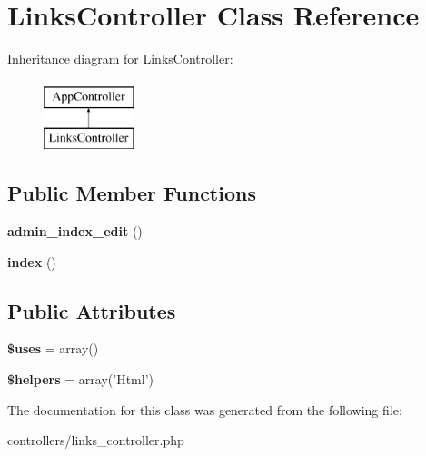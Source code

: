 \hypertarget{class_links_controller}{
\section{\-Links\-Controller \-Class \-Reference}
\label{class_links_controller}
}
\-Inheritance diagram for \-Links\-Controller\-:\begin{figure}[H]
\begin{center}
\leavevmode
\includegraphics[height=2.000000cm]{class_links_controller}
\end{center}
\end{figure}
\subsection*{\-Public \-Member \-Functions}
\begin{DoxyCompactItemize}
\item 
\hypertarget{class_links_controller_a4ca0ff9e52ff79e9b90097fde0d0564a}{
{\bfseries admin\-\_\-index\-\_\-edit} ()}
\label{class_links_controller_a4ca0ff9e52ff79e9b90097fde0d0564a}

\item 
\hypertarget{class_links_controller_ac570197a5f81b1e9bcd2d5a46c79d1a2}{
{\bfseries index} ()}
\label{class_links_controller_ac570197a5f81b1e9bcd2d5a46c79d1a2}

\end{DoxyCompactItemize}
\subsection*{\-Public \-Attributes}
\begin{DoxyCompactItemize}
\item 
\hypertarget{class_links_controller_a1c2fe1469f4ca798704cfc6b9a999357}{
{\bfseries \$uses} = array()}
\label{class_links_controller_a1c2fe1469f4ca798704cfc6b9a999357}

\item 
\hypertarget{class_links_controller_aeffe7edd4098c5c616944c9afa087ce1}{
{\bfseries \$helpers} = array('\-Html')}
\label{class_links_controller_aeffe7edd4098c5c616944c9afa087ce1}

\end{DoxyCompactItemize}


\-The documentation for this class was generated from the following file\-:\begin{DoxyCompactItemize}
\item 
controllers/links\-\_\-controller.\-php\end{DoxyCompactItemize}
